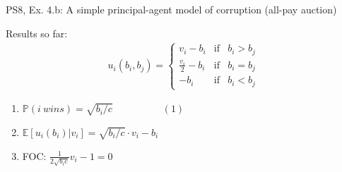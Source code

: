 \begin{frame}{PS8, Ex. 4.b: A simple principal-agent model of corruption (all-pay auction)}
\begin{multicols}{2}
      Results so far: \vspace{-6pt}
      \begin{align*}
        u_i(b_i,b_j)=\left\{\begin{array}{lcl}
          v_i-b_i           & \text{if} & b_i>b_j \\
          \frac{v_i}{2}-b_i & \text{if} & b_i=b_j \\
          -b_i              & \text{if} & b_i<b_j
        \end{array}\right.
      \end{align*} \vspace{-16pt}
      \begin{enumerate}
        \item $\mathbb{P}(i\ wins)=\sqrt{b_i/c}\quad\quad\quad\quad\quad(1)$
        \item $\mathbb{E}[u_i(b_i)|v_i]=\sqrt{b_i/c}\cdot v_i-b_i$
        \item FOC: $\frac{1}{2\sqrt{b_ic}}v_i-1=0$
      \end{enumerate}
      \vfill\null
    \end{multicols}
\end{frame}
